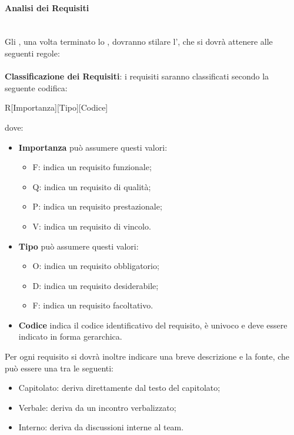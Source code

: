 \paragraph{Analisi dei Requisiti}
	~\\Gli \anas, una volta terminato lo \SdF, dovranno stilare l'\AdR, che si dovrà attenere alle seguenti regole: \\
	~\\ \textbf{Classificazione dei Requisiti}:
	i requisiti saranno classificati secondo la seguente codifica:
		\begin{center}
			R[Importanza][Tipo][Codice]
		\end{center}
	dove:
	\begin{itemize}
		\item \textbf{Importanza} può assumere questi valori:
			\begin{itemize}
				\item F: indica un requisito funzionale;
				\item Q: indica un requisito di qualità;
				\item P: indica un requisito prestazionale;
				\item V: indica un requisito di vincolo.
			\end{itemize}
		\item \textbf{Tipo} può assumere questi valori:
			\begin{itemize}
				\item O: indica un requisito obbligatorio;
				\item D: indica un requisito desiderabile;
				\item F: indica un requisito facoltativo.
			\end{itemize}
		\item \textbf{Codice} indica il codice identificativo del requisito, è univoco e deve essere indicato in
		forma gerarchica.
	\end{itemize}
	Per ogni requisito si dovrà inoltre indicare una breve descrizione e la fonte, che può essere una tra le seguenti:
		\begin{itemize}
		\item Capitolato: deriva direttamente dal testo del capitolato;
		\item Verbale: deriva da un incontro verbalizzato;
		\item Interno: deriva da discussioni interne al team.
		\end{itemize}
	
